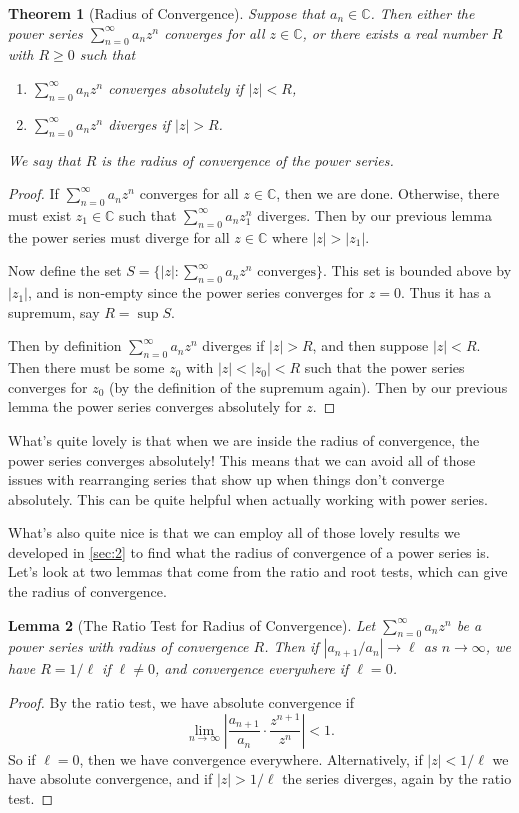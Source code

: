 \documentclass[11pt, a4paper]{article}
\newtheorem{theorem}{Theorem}[section]
\newtheorem{lemma}[theorem]{Lemma}
\theoremstyle{definition}
\newcommand{\vocab}[1]{\emph{#1}} %
\newcommand{\C}{\mathbb{C}}
\begin{document}
\begin{theorem}[Radius of Convergence]
	Suppose that $a_n \in \C$. Then either the power series $\sum_{n = 0}^\infty a_n z^n$ converges for all $z \in \C$, or there exists a real number $R$ with $R \geq 0$ such that
	\begin{enumerate}[label=(\roman*)]
		\item $\sum_{n =0}^\infty a_n z^n$ converges absolutely if $|z| < R$,
		\item $\sum_{n =0}^\infty a_n z^n$ diverges if $|z| > R$.
	\end{enumerate}
	We say that $R$ is the \vocab{radius of convergence} of the power series.
\end{theorem}
\begin{proof}
	If $\sum_{n = 0}^\infty a_n z^n$ converges for all $z \in \C$, then we are done. Otherwise, there must exist $z_1 \in \C$ such that $\sum_{n = 0}^{\infty} a_n z_1^n$ diverges. Then by our previous lemma the power series must diverge for all $z \in \C$ where $|z| > |z_1|$.

	Now define the set $S = \{|z| : \sum_{n = 0}^\infty a_n z^n \text{ converges}\}$. This set is bounded above by $|z_1|$, and is non-empty since the power series converges for $z = 0$. Thus it has a supremum, say $R = \sup S$. 

	Then by definition $\sum_{n = 0}^{\infty} a_n z^n$ diverges if $|z| > R$, and then suppose $|z| < R$. Then there must be some $z_0$ with $|z| < |z_0| < R$ such that the power series converges for $z_0$ (by the definition of the supremum again). Then by our previous lemma the power series converges absolutely for $z$.
\end{proof}

What's quite lovely is that when we are inside the radius of convergence, the power series converges absolutely! This means that we can avoid all of those issues with rearranging series that show up when things don't converge absolutely. This can be quite helpful when actually working with power series.

What's also quite nice is that we can employ all of those lovely results we developed in \autoref{sec:2} to find what the radius of convergence of a power series is.
Let's look at two lemmas that come from the ratio and root tests, which can give the radius of convergence. 

\begin{lemma}[The Ratio Test for Radius of Convergence]
	Let $\sum_{n = 0}^{\infty} a_n z^n$ be a power series with radius of convergence $R$.
	Then if $|a_{n + 1}/a_n| \rightarrow \ell$ as $n \rightarrow \infty$, we have $R = 1/\ell$ if $\ell \neq 0$, and convergence everywhere if $\ell = 0$.
\end{lemma}
\begin{proof}
	By the ratio test, we have absolute convergence if 
	$$
	\lim_{n \to \infty} \left|\frac{a_{n + 1}}{a_{n}} \cdot \frac{z^{n + 1}}{z^n}\right| < 1.
	$$
	So if $\ell = 0$, then we have convergence everywhere. Alternatively, if $|z| < 1/\ell$ we have absolute convergence, and if $|z| > 1/\ell$ the series diverges, again by the ratio test.
\end{proof}
\end{document}
